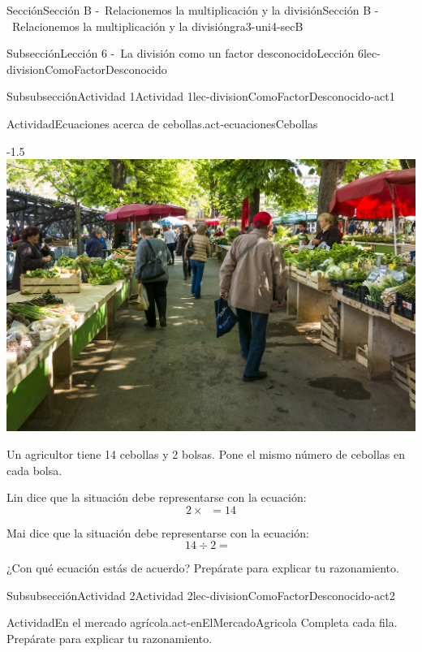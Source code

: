 \documentclass[twoside,10pt,]{article}
\begin{document}
\begin{sectionptx}{Sección}{Sección B -~Relacionemos la multiplicación y la división}{}{Sección B -~Relacionemos la multiplicación y la división}{}{}{gra3-uni4-secB}
\begin{subsectionptx}{Subsección}{Lección 6 -~La división como un factor desconocido}{}{Lección 6}{}{}{lec-divisionComoFactorDesconocido}
\begin{subsubsectionptx}{Subsubsección}{Actividad 1}{}{Actividad 1}{}{}{lec-divisionComoFactorDesconocido-act1}
\begin{activity}{Actividad}{Ecuaciones acerca de cebollas.}{act-ecuacionesCebollas}%
\begin{image}{0.15}{0.7}{0.15}{-1.5\baselineskip}%
\includegraphics[width=\linewidth]{external/jpg-source/3.4.B6 Act 1 Launch.jpg}
\end{image}%
Un agricultor tiene 14 cebollas y 2 bolsas. Pone el mismo número de cebollas en cada bolsa.%
\par
Lin dice que la situación debe representarse con la ecuación:%
\begin{equation*}
2 \times \boxed{\phantom{3}} = 14
\end{equation*}
%
\par
Mai dice que la situación debe representarse con la ecuación:%
\begin{equation*}
14 \div 2 = \boxed{\phantom{3}}
\end{equation*}
%
\par
¿Con qué ecuación estás de acuerdo? Prepárate para explicar tu razonamiento.%
\end{activity}%
%
\end{subsubsectionptx}
%
%
\typeout{************************************************}
\typeout{************************************************}
%
\begin{subsubsectionptx}{Subsubsección}{Actividad 2}{}{Actividad 2}{}{}{lec-divisionComoFactorDesconocido-act2}
\begin{activity}{Actividad}{En el mercado agrícola.}{act-enElMercadoAgricola}%
Completa cada fila. Prepárate para explicar tu razonamiento.%

\end{activity}
\end{subsubsectionptx}
\end{subsectionptx}
\end{sectionptx}
\end{document}
